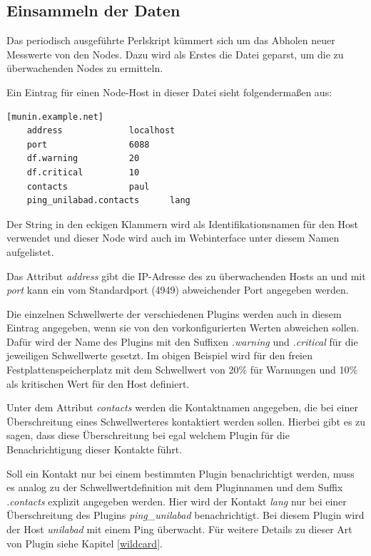 \subsection{Einsammeln der Daten}
Das periodisch ausgeführte Perlskript  kümmert sich um das Abholen neuer Messwerte von den Nodes.
Dazu wird als Erstes die Datei  geparst, um die zu überwachenden Nodes zu ermitteln.

Ein Eintrag für einen Node-Host in dieser Datei sieht folgendermaßen aus:


\begin{lstlisting}[captionpos=b, caption=Beispielhafte Definition eines Munin-Nodes, label=nodedef, breaklines = true, language=bash]
[munin.example.net]
	address 			localhost
	port				6088
	df.warning			20
	df.critical			10
	contacts			paul
	ping_unilabad.contacts		lang
\end{lstlisting}

Der String in den eckigen Klammern wird als Identifikationsnamen für den Host verwendet und dieser Node wird auch im Webinterface unter diesem Namen aufgelistet.

Das Attribut \textit{address} gibt die IP-Adresse des zu überwachenden Hosts an und mit \textit{port} kann ein vom Standardport (4949) abweichender Port angegeben werden.

Die einzelnen Schwellwerte der verschiedenen Plugins werden auch in diesem Eintrag angegeben, wenn sie von den vorkonfigurierten Werten abweichen sollen.
Dafür wird der Name des Plugins mit den Suffixen \textit{.warning} und \textit{.critical} für die jeweiligen Schwellwerte gesetzt.
Im obigen Beispiel wird  für den freien Festplattenspeicherplatz mit dem Schwellwert von 20\% für Warnungen und 10\% als kritischen Wert für den Host definiert.

Unter dem Attribut \textit{contacts} werden die Kontaktnamen angegeben, die bei einer Überschreitung eines Schwellwerteres kontaktiert werden sollen.
Hierbei gibt es zu sagen, dass diese Überschreitung bei egal welchem Plugin für die Benachrichtigung dieser Kontakte führt.

Soll ein Kontakt nur bei einem bestimmten Plugin benachrichtigt werden, muss es analog zu der Schwellwertdefinition mit dem Pluginnamen und dem Suffix \textit{.contacts} explizit angegeben werden. Hier wird der Kontakt \textit{lang} nur bei einer Überschreitung des Plugins \textit{ping\_unilabad} benachrichtigt.
Bei diesem Plugin wird der Host \textit{unilabad} mit einem Ping überwacht.
Für weitere Details zu dieser Art von Plugin siehe Kapitel \ref{wildcard}.

